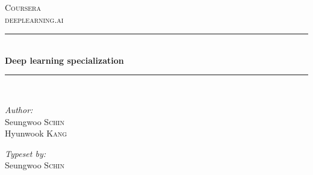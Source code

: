 \documentclass[twoside]{article}
\begin{document}

\begin{titlepage}

\newcommand{\HRule}{\rule{\linewidth}{0.5mm}} %

\center %
 

\vspace*{3cm}
\textsc{\Large Coursera}\\[0.5cm] %
\textsc{\large deeplearning.ai}\\[0.5cm] %


\HRule \\[0.4cm]
{ \huge \bfseries Deep learning specialization}\\[0.4cm] %
\HRule \\[1.5cm]
 

\begin{minipage}{0.4\textwidth}
\begin{flushleft} \large
\emph{Author:}\\
Seungwoo \textsc{Schin} \\%


Hyunwook \textsc{Kang} %
\end{flushleft}
\end{minipage}
\begin{minipage}{0.4\textwidth}
\begin{flushright} \large
\emph{Typeset by:} \\
Seungwoo \textsc{Schin} %



\end{flushright}
\end{minipage}
\end{titlepage}
\end{document}

